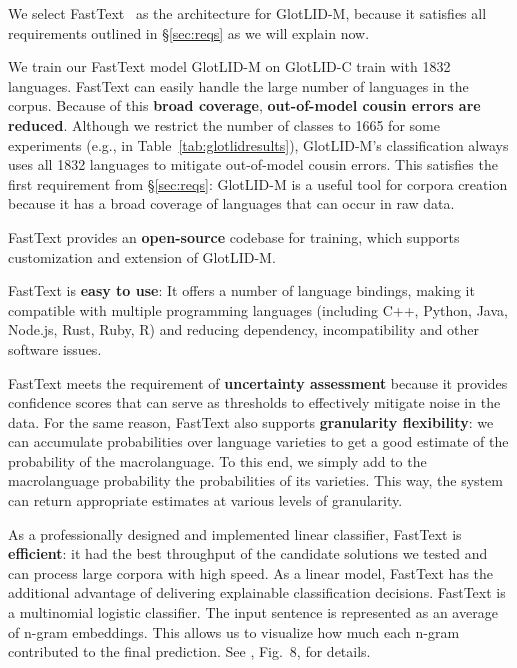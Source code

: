 \documentclass[11pt]{article}
\def\numberlanguagesaccurate{1665\xspace}
\def\numberlanguagestotal{1832\xspace}
\def\modelname{\mbox{GlotLID-M}\xspace}
\def\corpusname{\mbox{GlotLID-C}\xspace}
\def\macrolanguage{macrolanguage\xspace}
\def\tabref#1{Table~\ref{tab:#1}}
\def\secref#1{\S\ref{sec:#1}}
\begin{document}
We select
FastText~\citep{joulin-etal-2017-bag}
as the architecture for \modelname, because it satisfies all
requirements
outlined in \secref{reqs} as we will explain now.

We train our FastText model \modelname on \corpusname train 
with \numberlanguagestotal languages. FastText can easily handle the large
number of languages in the
corpus. Because of this \textbf{broad coverage}, \textbf{out-of-model
cousin errors are reduced}. 
Although we restrict
the number of classes to \numberlanguagesaccurate for some
experiments (e.g., in \tabref{glotlidresults}),
\modelname's  classification always uses
all \numberlanguagestotal languages to mitigate
out-of-model cousin errors.
This satisfies the first
requirement from \secref{reqs}: \modelname is a useful tool
for corpora creation because it has a broad coverage of
languages that can occur in raw data.

FastText provides an \textbf{open-source} codebase for
training, which supports customization and
extension of \modelname.

FastText is \textbf{easy to use}: It offers a number of
language bindings, making it compatible with multiple
programming languages (including C++, Python, Java, Node.js, Rust, Ruby, R) and reducing
dependency, incompatibility and other software issues.

FastText
meets the requirement of \textbf{uncertainty assessment}
because it
provides confidence
scores that can serve as  thresholds to
effectively mitigate noise in the data.  
For the same reason, FastText also supports \textbf{granularity
flexibility}: we can accumulate probabilities over language varieties to get
a good estimate of the probability of the \macrolanguage.
To this end, we simply add to the \macrolanguage probability
the probabilities of its varieties. This way, the system can
return appropriate estimates at various levels of granularity.

As a professionally designed and implemented linear classifier,
FastText is \textbf{efficient}: it had the best throughput of the candidate solutions
we tested and can process large corpora with high speed.
As a linear model, FastText has the additional advantage of 
delivering explainable classification decisions.
FastText is a multinomial logistic classifier. The input
sentence
is represented as an average of  n-gram embeddings. 
This allows us to visualize
how much each n-gram contributed to the final prediction.
See
\citet{nllbteam2022language}, Fig.\ 8, for details.
\end{document}
